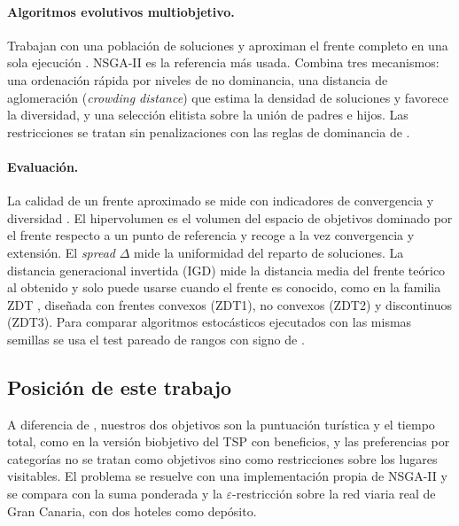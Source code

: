 \paragraph{Algoritmos evolutivos multiobjetivo.} Trabajan con una población de soluciones y aproximan el frente completo en una sola ejecución \citep{coello2007}. NSGA-II \citep{deb2002} es la referencia más usada. Combina tres mecanismos: una ordenación rápida por niveles de no dominancia, una distancia de aglomeración (\emph{crowding distance}) que estima la densidad de soluciones y favorece la diversidad, y una selección elitista sobre la unión de padres e hijos. Las restricciones se tratan sin penalizaciones con las reglas de dominancia de \citet{deb2000}.

\paragraph{Evaluación.} La calidad de un frente aproximado se mide con indicadores de convergencia y diversidad \citep{audet2021}. El hipervolumen \citep{zitzler1999} es el volumen del espacio de objetivos dominado por el frente respecto a un punto de referencia y recoge a la vez convergencia y extensión. El \emph{spread} $\Delta$ \citep{deb2002} mide la uniformidad del reparto de soluciones. La distancia generacional invertida (IGD) mide la distancia media del frente teórico al obtenido y solo puede usarse cuando el frente es conocido, como en la familia ZDT \citep{zitzler2000}, diseñada con frentes convexos (ZDT1), no convexos (ZDT2) y discontinuos (ZDT3). Para comparar algoritmos estocásticos ejecutados con las mismas semillas se usa el test pareado de rangos con signo de \citet{wilcoxon1945}.

\subsection{Posición de este trabajo}

A diferencia de \citet{schilde2009}, nuestros dos objetivos son la puntuación turística y el tiempo total, como en la versión biobjetivo del TSP con beneficios, y las preferencias por categorías no se tratan como objetivos sino como restricciones sobre los lugares visitables. El problema se resuelve con una implementación propia de NSGA-II y se compara con la suma ponderada y la $\varepsilon$-restricción sobre la red viaria real de Gran Canaria, con dos hoteles como depósito.
